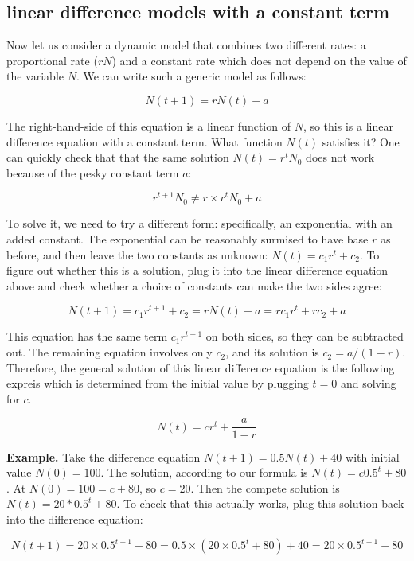 \documentclass[
  letterpaper,
  DIV=11,
  numbers=noendperiod]{scrreprt}
\begin{document}
\hypertarget{linear-difference-models-with-a-constant-term}{%
\subsection{linear difference models with a constant
term}\label{linear-difference-models-with-a-constant-term}}

Now let us consider a dynamic model that combines two different rates: a
proportional rate (\(rN\)) and a constant rate which does not depend on
the value of the variable \(N\). We can write such a generic model as
follows:

\[
N(t+1) =  rN(t) + a
\]

The right-hand-side of this equation is a linear function of \(N\), so
this is a linear difference equation with a constant term. What function
\(N(t)\) satisfies it? One can quickly check that that the same solution
\(N(t) = r^t N_0\) does not work because of the pesky constant term
\(a\):

\[
r^{t+1} N_0 \neq r \times r^t N_0 + a
\]

To solve it, we need to try a different form: specifically, an
exponential with an added constant. The exponential can be reasonably
surmised to have base \(r\) as before, and then leave the two constants
as unknown: \(N(t) = c_1 r^t + c_2\). To figure out whether this is a
solution, plug it into the linear difference equation above and check
whether a choice of constants can make the two sides agree:

\[
N(t+1) =  c_1 r^{t +1} + c_2 = rN(t) + a  = rc_1 r^t + rc_2+ a
\]

This equation has the same term \(c_1 r^{t +1}\) on both sides, so they
can be subtracted out. The remaining equation involves only \(c_2\), and
its solution is \(c_2 = a/(1-r)\). Therefore, the general solution of
this linear difference equation is the following expreis which is
determined from the initial value by plugging \(t=0\) and solving for
\(c\).

\[
N(t) = c r^t  + \frac{a}{1-r}
\label{eq:ch14_sol_wconst}
\]

\textbf{Example.} Take the difference equation
\(N(t+1) = 0.5 N(t) + 40\) with initial value \(N(0)= 100\). The
solution, according to our formula is \(N(t) = c 0.5^t + 80\). At
\(N(0) = 100 = c+80\), so \(c=20\). Then the compete solution is
\(N(t) = 20*0.5^t + 80\). To check that this actually works, plug this
solution back into the difference equation:

\[
N(t+1) = 20 \times 0.5^{t+1} + 80 = 0.5 \times (20 \times 0.5^t + 80) + 40 =  20 \times 0.5^{t+1} + 80
\]
\end{document}
